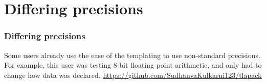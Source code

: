 \documentclass[12pt]{beamer}
\begin{document}
    \section{Differing precisions}
    \begin{frame}
        \frametitle{Differing precisions}
        Some users already use the ease of the templating to use non-standard precisions. For example, this
        user was testing 8-bit floating point arithmetic, and only had to change how data was declared.
        \url{https://github.com/SudhanvaKulkarni123/tlapack}
    \end{frame}
\end{document}
